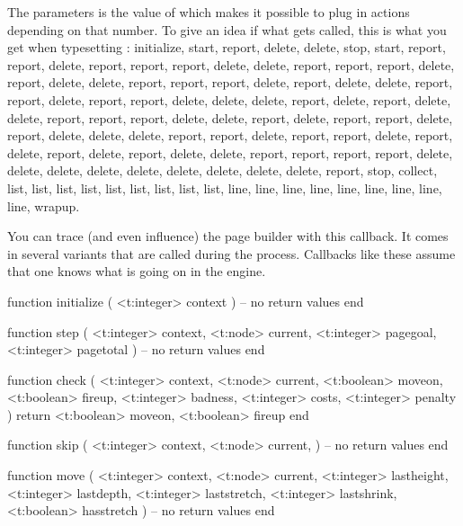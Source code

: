 \startfourrows
{}
\stopfourrows

The  parameters is the value of \type {\linebreakchecks} which
makes it possible to plug in actions depending on that number. To give an idea if
what gets called, this is what you get when typesetting :
initialize, start, report, delete, delete, stop, start, report, report, delete,
report, report, report, delete, delete, report, report, report, delete, report,
delete, delete, report, report, report, delete, report, delete, delete, report,
report, delete, report, report, delete, delete, delete, report, delete, report,
delete, delete, report, report, report, delete, delete, report, delete, report,
report, delete, report, delete, delete, delete, report, report, delete, report,
report, delete, report, delete, report, delete, report, delete, delete, report,
report, report, report, delete, delete, delete, delete, delete, delete, delete,
delete, delete, report, stop, collect, list, list, list, list, list, list, list,
list, list, line, line, line, line, line, line, line, line, line, wrapup.

\stopsubsection

\startsubsection[title=show_build]

You can trace (and even influence) the page builder with this callback. It comes in
several variants that are called during the process. Callbacks like these assume that
one knows what is going on in the engine.

\starttyping[option=LUA]
function initialize (
    <t:integer> context
)
    -- no return values
end
\stoptyping

\starttyping[option=LUA]
function step (
    <t:integer> context,
    <t:node>    current,
    <t:integer> pagegoal,
    <t:integer> pagetotal
)
    -- no return values
end
\stoptyping

\starttyping[option=LUA]
function check (
    <t:integer> context,
    <t:node>    current,
    <t:boolean> moveon,
    <t:boolean> fireup,
    <t:integer> badness,
    <t:integer> costs,
    <t:integer> penalty
)
    return <t:boolean> moveon, <t:boolean> fireup
end
\stoptyping

\starttyping[option=LUA]
function skip (
    <t:integer> context,
    <t:node>    current,
)
    -- no return values
end
\stoptyping

\starttyping[option=LUA]
function move (
    <t:integer> context,
        <t:node>    current,
        <t:integer> lastheight,
        <t:integer> lastdepth,
        <t:integer> laststretch,
        <t:integer> lastshrink,
        <t:boolean> hasstretch
)
    -- no return values
end
\stoptyping

